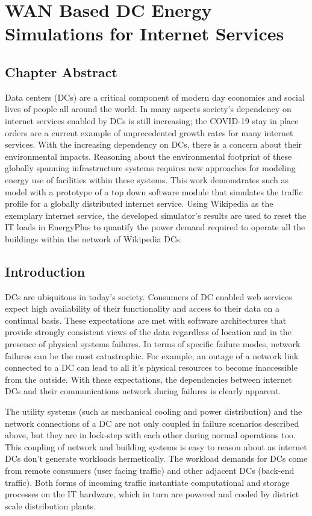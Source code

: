 \chapter{WAN Based DC Energy Simulations for Internet Services}
\label{chp:traffic}

\section{Chapter Abstract}
    Data centers (DCs) are a critical component of modern day economies and social lives of people all around the world. In many aspects society’s dependency on internet services enabled by DCs is still increasing; the COVID-19 stay in place orders are a current example of unprecedented growth rates for many internet services. With the increasing dependency on DCs, there is a concern about their environmental impacts. Reasoning about the environmental footprint of these globally spanning infrastructure systems requires new approaches for modeling energy use of facilities within these systems. This work demonstrates such as model with a prototype of a top down software module that simulates the traffic profile for a globally distributed internet service. Using Wikipedia as the exemplary internet service, the developed simulator's results are used to reset the IT loads in EnergyPlus to quantify the power demand required to operate all the buildings within the network of Wikipedia DCs.   
    


\section{Introduction}

    DCs are ubiquitous in today’s society. Consumers of DC enabled web services expect high availability of their functionality and access to their data on a continual basis. These expectations are met with software architectures that provide strongly consistent views of the data regardless of location and in the presence of physical systems failures. In terms of specific failure modes, network failures can be the most catastrophic. For example, an outage of a network link connected to a DC can lead to all it's physical resources to become inaccessible from the outside. With these expectations, the dependencies between internet DCs and their communications network during failures is clearly apparent.
    
    The utility systems (such as mechanical cooling and power distribution) and the network connections of a DC are not only coupled in failure scenarios described above, but they are in lock-step with each other during normal operations too. This coupling of network and building systems is easy to reason about as internet DCs don’t generate workloads hermetically. The workload demands for DCs come from remote consumers (user facing traffic) and other adjacent DCs (back-end traffic). Both forms of incoming traffic instantiate computational and storage processes on the IT hardware, which in turn are powered and cooled by district scale distribution plants.
    
